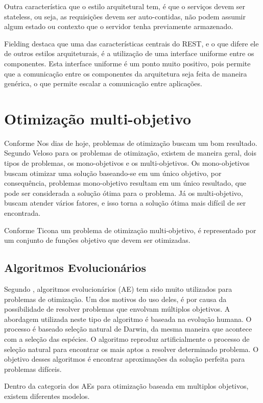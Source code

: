 Outra característica que o estilo arquitetural tem, é que o serviços devem ser stateless, ou seja, as  
requisições devem ser auto-contidas, não podem assumir algum estado ou contexto que o servidor tenha 
previamente armazenado. 

Fielding \cite{fielding} destaca que uma das características centrais do REST, e o que difere ele 
de outros estilos arquiteturais, é a utilização de uma interface uniforme entre os componentes. 
Esta interface uniforme é um ponto muito positivo, pois permite que a comunicação entre os 
componentes da arquitetura seja feita de maneira genérica, o que permite escalar a comunicação 
entre aplicações.

\section{Otimização multi-objetivo}  
Conforme Nos dias de hoje, problemas de otimização buscam um bom resultado.
Segundo Veloso \cite{veloso} para os problemas de otimização, existem de maneira geral, 
dois tipos de problemas, os mono-objetivos e os multi-objetivos. 
Os mono-objetivos buscam otimizar uma solução baseando-se em um único objetivo, por consequência, 
problemas mono-objetivo resultam em um único resultado, que pode ser considerada a solução ótima para o 
problema. Já os multi-objetivo, buscam atender vários fatores, e isso torna a solução ótima mais 
difícil de ser encontrada.

Conforme Ticona \cite{ticona} um problema de otimização multi-objetivo, é representado por um 
conjunto de funções objetivo que devem ser otimizadas. 
 
\subsection{Algoritmos Evolucionários}
Segundo \cite{ticona}, algoritmos evolucionários (AE) tem sido muito utilizados para problemas de 
otimização. Um dos motivos do uso deles, é por causa da possibilidade de resolver problemas que 
envolvam múltiplos objetivos. A abordagem utilizada neste tipo de algoritmo é baseada na 
evolução humana. O processo é baseado seleção natural de Darwin, da mesma maneira que acontece com a 
seleção das espécies. O algoritmo reproduz artificialmente o processo de seleção natural para 
encontrar os mais aptos a resolver determinado problema. O objetivo desses algoritmos é 
encontrar aproximações da solução perfeita para problemas difíceis. 

Dentro da categoria dos AEs para otimização baseada em multiplos objetivos, existem diferentes modelos. 

